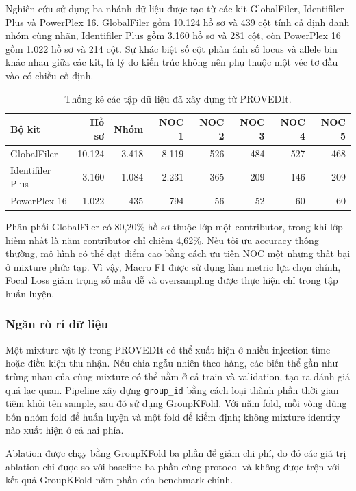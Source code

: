 \documentclass[12pt,a4paper]{article}
\begin{document}
Nghiên cứu sử dụng ba nhánh dữ liệu được tạo từ các kit GlobalFiler, Identifiler Plus và PowerPlex 16. GlobalFiler gồm 10.124 hồ sơ và 439 cột tính cả định danh nhóm cùng nhãn, Identifiler Plus gồm 3.160 hồ sơ và 281 cột, còn PowerPlex 16 gồm 1.022 hồ sơ và 214 cột. Sự khác biệt số cột phản ánh số locus và allele bin khác nhau giữa các kit, là lý do kiến trúc không nên phụ thuộc một véc tơ đầu vào có chiều cố định.

\begin{table}[H]
\centering
\caption{Thống kê các tập dữ liệu đã xây dựng từ PROVEDIt.}
\label{tab:data_stats}
\small
\begin{tabular}{lrrrrrrr}
\toprule
\textbf{Bộ kit} & \textbf{Hồ sơ} & \textbf{Nhóm} & \textbf{NOC 1} & \textbf{NOC 2} &
\textbf{NOC 3} & \textbf{NOC 4} & \textbf{NOC 5} \\
\midrule
GlobalFiler & 10.124 & 3.418 & 8.119 & 526 & 484 & 527 & 468 \\
Identifiler Plus & 3.160 & 1.084 & 2.231 & 365 & 209 & 146 & 209 \\
PowerPlex 16 & 1.022 & 435 & 794 & 56 & 52 & 60 & 60 \\
\bottomrule
\end{tabular}
\end{table}

Phân phối GlobalFiler có 80,20\% hồ sơ thuộc lớp một contributor, trong khi lớp hiếm nhất là năm contributor chỉ chiếm 4,62\%. Nếu tối ưu accuracy thông thường, mô hình có thể đạt điểm cao bằng cách ưu tiên NOC một nhưng thất bại ở mixture phức tạp. Vì vậy, Macro F1 được sử dụng làm metric lựa chọn chính, Focal Loss giảm trọng số mẫu dễ và oversampling được thực hiện chỉ trong tập huấn luyện.

\subsubsection{Ngăn rò rỉ dữ liệu}

Một mixture vật lý trong PROVEDIt có thể xuất hiện ở nhiều injection time hoặc điều kiện thu nhận. Nếu chia ngẫu nhiên theo hàng, các biến thể gần như trùng nhau của cùng mixture có thể nằm ở cả train và validation, tạo ra đánh giá quá lạc quan. Pipeline xây dựng \texttt{group\_id} bằng cách loại thành phần thời gian tiêm khỏi tên sample, sau đó sử dụng GroupKFold. Với năm fold, mỗi vòng dùng bốn nhóm fold để huấn luyện và một fold để kiểm định; không mixture identity nào xuất hiện ở cả hai phía.

Ablation được chạy bằng GroupKFold ba phần để giảm chi phí, do đó các giá trị ablation chỉ được so với baseline ba phần cùng protocol và không được trộn với kết quả GroupKFold năm phần của benchmark chính.
\end{document}
